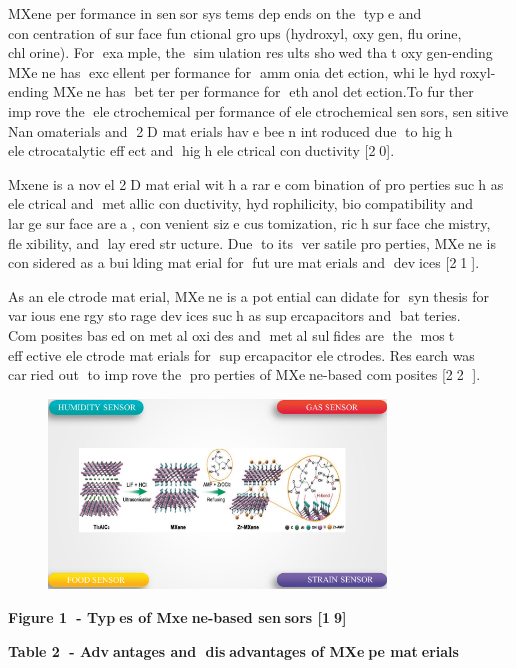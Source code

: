 {MXene performance in sensor systems depends on the type and
concentration of surface functional groups (hydroxyl, oxygen,
fluorine, chlorine). For example, the simulation results showed
that oxygen-ending MXene has excellent performance for ammonia
detection, while hydroxyl-ending MXene has better performance
for ethanol detection.To further improve the electrochemical
performance of electrochemical sensors, sensitive Nanomaterials
and 2D materials have been introduced due to high
electrocatalytic effect and high electrical conductivity
{[}20{]}.

Mxene is a novel 2D material with a rare combination of
properties such as electrical and metallic conductivity,
hydrophilicity, biocompatibility and large surface area ,
convenient size customization, rich surface chemistry,
flexibility, and layered structure. Due to its versatile
properties, MXene is considered as a building material for future
materials and devices {[}21{]}.

As an electrode material, MXene is a potential candidate for
synthesis for various energy storage devices such as
supercapacitors and batteries. Composites based on metal oxides
and metal sulfides are the most effective electrode materials
for supercapacitor electrodes. Research was carried out to
improve the properties of MXene-based composites {[}22 {]}.

\begin{figure}[H]
	\centering
	\includegraphics[width=0.8\textwidth]{media/chem2/image12}
	\caption*{}
\end{figure}


{\bfseries Figure 1 - Types of Mxene-based sensors {[}19{]}}

{\bfseries Table 2 - Advantages and disadvantages of MXepe materials}

}
